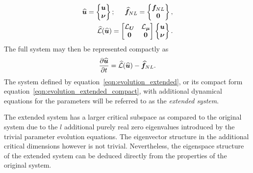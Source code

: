 \begin{eqnarray}
	{\widehat{ \boldsymbol{u} }} = \begin{Bmatrix}
		\boldsymbol{u} \\ 
		\boldsymbol{\nu}
	\end{Bmatrix}; \hspace{5mm}
	{\widehat{ \boldsymbol{f} }}_{NL} = \begin{Bmatrix}
		\boldsymbol{f}_{NL} \\ 
		\boldsymbol{0}
	\end{Bmatrix},	\\
	\mathcal{\widehat{L}}({\widehat{\boldsymbol{u}}}) =
	\begin{bmatrix}
		\mathcal{L}_{\boldsymbol{U}} & \mathcal{L}_{\boldsymbol{\mu}} \\
		\mathbf{0} 	& \mathbf{0}
	\end{bmatrix}
	\begin{Bmatrix}
		\boldsymbol{u} \\
		\boldsymbol{\nu}
	\end{Bmatrix}
	\label{eqn:linearized_operator_extended}.
\end{eqnarray}
The full system may then be represented compactly as
\begin{equation}
	\label{eqn:evolution_extended_compact}
	\dfrac{\partial {\widehat{ \boldsymbol{u} }}}{\partial t} =
	\mathcal{\widehat{L}}({\widehat{\boldsymbol{u}}})  - {\widehat{\boldsymbol{f}}}_{NL}.
\end{equation}
The system defined by equation~\eqref{eqn:evolution_extended}, or its compact form equation~\eqref{eqn:evolution_extended_compact}, with additional dynamical equations for the parameters will be referred to as the \emph{extended system}. 

The extended system has a larger critical subspace as compared to the original system due to the $l$ additional purely real zero eigenvalues introduced by the trivial parameter evolution equations. The eigenvector structure in the additional critical dimensions however is not trivial. Nevertheless, the eigenspace structure of the extended system can be deduced directly from the properties of the original system. 

